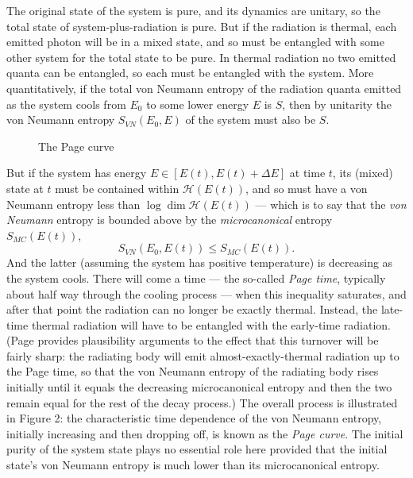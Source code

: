 \documentclass[12pt]{article}
\newcommand{\mc}[1]{\ensuremath{\mathcal{#1}}}
\newcommand{\be}{\begin{equation}}
\newcommand{\ee}{\end{equation}}
\begin{document}
The original state of the system is pure, and its dynamics are unitary, so the total state of system-plus-radiation is pure. But if the radiation is thermal, each emitted photon will be in a mixed state, and so must be entangled with some other system for the total state to be pure. In thermal radiation no two emitted quanta can be entangled, so each must be entangled with the system. More quantitatively, if the total von Neumann entropy of the  radiation quanta emitted as the system cools from $E_0$ to some lower energy $E$ is $S$, then by unitarity the von Neumann entropy $S_{VN}(E_0,E)$ of the system must also be $S$. 
\begin{figure}
\caption{The Page curve}
\end{figure}
But if the system has energy $E\in [E(t),E(t)+\Delta E]$ at time $t$, its (mixed) state at $t$ must be contained within $\mc{H}(E(t))$, and so must have a von Neumann entropy less than $\log \dim \mc{H}(E(t))$ --- which is to say that the \emph{von Neumann} entropy is bounded above by the \emph{microcanonical} entropy $S_{MC}(E(t))$,
\be
S_{VN}(E_0,E(t))\leq S_{MC}(E(t)).
\ee And the latter (assuming the system has positive temperature) is decreasing as the system cools. There will come a time --- the so-called \emph{Page time}, typically about half way through the cooling process --- when this inequality saturates, and after that point the radiation can no longer be exactly thermal. Instead, the late-time thermal radiation will have to be entangled with the early-time radiation. (Page provides plausibility arguments to the effect that this turnover will be fairly sharp: the radiating body will emit almost-exactly-thermal radiation up to the Page time, so that the von Neumann entropy of the radiating body rises initially until it equals the decreasing microcanonical entropy and then the two remain equal for the rest of the decay process.) The overall process is illustrated in Figure 2: the characteristic time dependence of the von Neumann entropy, initially increasing and then dropping off, is known as the \emph{Page curve}. The initial purity of the system state plays no essential role here provided that the initial state's von Neumann entropy is much lower than its microcanonical entropy. 
\end{document}
